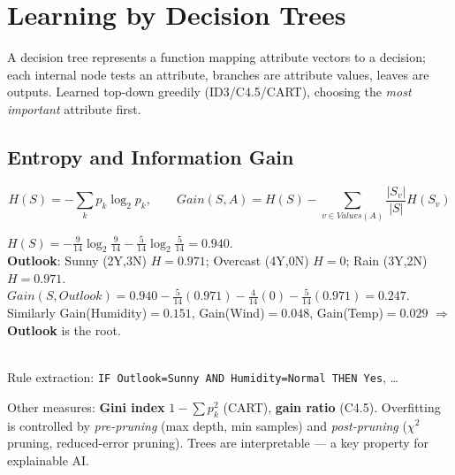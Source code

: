 \section{Learning by Decision Trees}
A decision tree represents a function mapping attribute vectors to a decision; each internal node tests an attribute, branches are attribute values, leaves are outputs. Learned top-down greedily (ID3/C4.5/CART), choosing the \emph{most important} attribute first.
\subsection{Entropy and Information Gain}
\[H(S)=-\sum_{k}p_k\log_2p_k,\qquad \textit{Gain}(S,A)=H(S)-\sum_{v\in\textit{Values}(A)}\frac{|S_v|}{|S|}H(S_v)\]
\begin{example}
\small
$H(S)=-\tfrac{9}{14}\log_2\tfrac{9}{14}-\tfrac{5}{14}\log_2\tfrac{5}{14}=0.940$.\\
\textbf{Outlook}: Sunny (2Y,3N) $H=0.971$; Overcast (4Y,0N) $H=0$; Rain (3Y,2N) $H=0.971$.\\
$\textit{Gain}(S,\textit{Outlook})=0.940-\tfrac{5}{14}(0.971)-\tfrac{4}{14}(0)-\tfrac{5}{14}(0.971)=\mathbf{0.247}$.\\
Similarly Gain(Humidity)$=0.151$, Gain(Wind)$=0.048$, Gain(Temp)$=0.029$ $\Rightarrow$ \textbf{Outlook} is the root.\\[2pt]
\\
Rule extraction: \texttt{IF Outlook=Sunny AND Humidity=Normal THEN Yes}, \dots
\end{example}
Other measures: \textbf{Gini index} $1-\sum p_k^2$ (CART), \textbf{gain ratio} (C4.5). Overfitting is controlled by \emph{pre-pruning} (max depth, min samples) and \emph{post-pruning} ($\chi^2$ pruning, reduced-error pruning). Trees are interpretable --- a key property for explainable AI.

